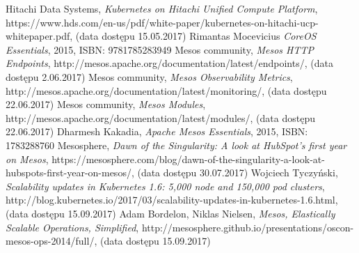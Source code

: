 \documentclass[10pt,a4paper,titlepage,twoside]{report}
\begin{document}
\begin{thebibliography}{99}
Hitachi Data Systems, \textit{Kubernetes on Hitachi Unified Compute Platform}, https://www.hds.com/en-us/pdf/white-paper/kubernetes-on-hitachi-ucp-whitepaper.pdf, (data dostępu 15.05.2017)
Rimantas Mocevicius \textit{CoreOS Essentials}, 2015, ISBN: 9781785283949
Mesos community, \textit{Mesos HTTP Endpoints}, http://mesos.apache.org/documentation/latest/endpoints/, (data dostępu 2.06.2017)
Mesos community, \textit{Mesos Observability Metrics}, http://mesos.apache.org/documentation/latest/monitoring/, (data dostępu 22.06.2017)
Mesos community, \textit{Mesos Modules}, http://mesos.apache.org/documentation/latest/modules/, (data dostępu 22.06.2017)
Dharmesh Kakadia, \textit{Apache Mesos Essentials}, 2015, ISBN: 1783288760
Mesosphere, \textit{Dawn of the Singularity: A look at HubSpot’s first year on Mesos}, https://mesosphere.com/blog/dawn-of-the-singularity-a-look-at-hubspots-first-year-on-mesos/, (data dostępu 30.07.2017)
Wojciech Tyczyński, \textit{Scalability updates in Kubernetes 1.6: 5,000 node and 150,000 pod clusters}, http://blog.kubernetes.io/2017/03/scalability-updates-in-kubernetes-1.6.html, (data dostępu 15.09.2017)
Adam Bordelon, Niklas Nielsen, \textit{Mesos, Elastically Scalable Operations, Simplified}, http://mesosphere.github.io/presentations/oscon-mesos-ops-2014/full/, (data dostępu 15.09.2017)
\end{thebibliography}

\end{document}

